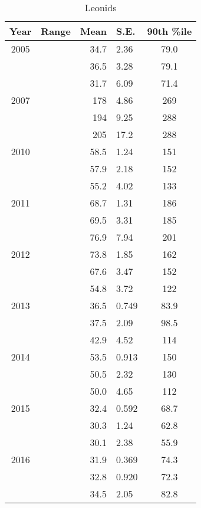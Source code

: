 \begin{table}[h!]
	\centering
	\begin{tabular}{|c|c|r@{ \,$\pm$\, }l|c|}
		\hline 
		Year & Range & Mean & S.E. & 90th \%ile\\ 
		\hline 
		2005 & & 34.7 & 2.36 & 79.0   \\ 
		\hline 
		& & 36.5 & 3.28 & 79.1   \\ 
		\hline 
		& & 31.7 & 6.09 & 71.4   \\ 
		\hline 
		2007 & & 178 & 4.86 & 269   \\ 
		\hline 
		& &	 194 & 9.25 & 288   \\ 
		\hline 
		& & 205 & 17.2 & 288   \\ 
		\hline 
		2010 & & 58.5 & 1.24 & 151   \\ 
		\hline 
		& &	 57.9 & 2.18 & 152   \\ 
		\hline 
		& & 55.2 & 4.02 & 133   \\ 
		\hline 
		2011 & & 68.7 & 1.31 & 186   \\ 
		\hline 
		& & 69.5 & 3.31 & 185   \\ 
		\hline 
		& & 76.9 & 7.94 & 201   \\ 
		\hline 
		2012 & & 73.8 & 1.85 & 162   \\ 
		\hline 
		& & 67.6 & 3.47 & 152   \\ 
		\hline 
		& & 54.8 & 3.72 & 122   \\ 
		\hline 
		2013 & & 36.5 & 0.749 & 83.9   \\ 
		\hline 
		& & 37.5 & 2.09 & 98.5   \\ 
		\hline 
		& & 42.9 & 4.52 & 114   \\ 
		\hline 
		2014 & & 53.5 & 0.913 & 150   \\ 
		\hline 
		& & 50.5 & 2.32 & 130   \\ 
		\hline 
		& & 50.0 & 4.65 & 112  \\ 
		\hline 
		2015 & & 32.4 & 0.592 & 68.7   \\ 
		\hline 
		& & 30.3 & 1.24 & 62.8   \\ 
		\hline 
		& & 30.1 & 2.38 & 55.9   \\ 
		\hline
		2016 & & 31.9 & 0.369 & 74.3	\\
		\hline 
		& & 32.8 & 0.920 & 72.3   \\ 
		\hline 
		& & 34.5 & 2.05 & 82.8   \\ 
		\hline 
	\end{tabular}
\caption{Leonids} 
\end{table}

